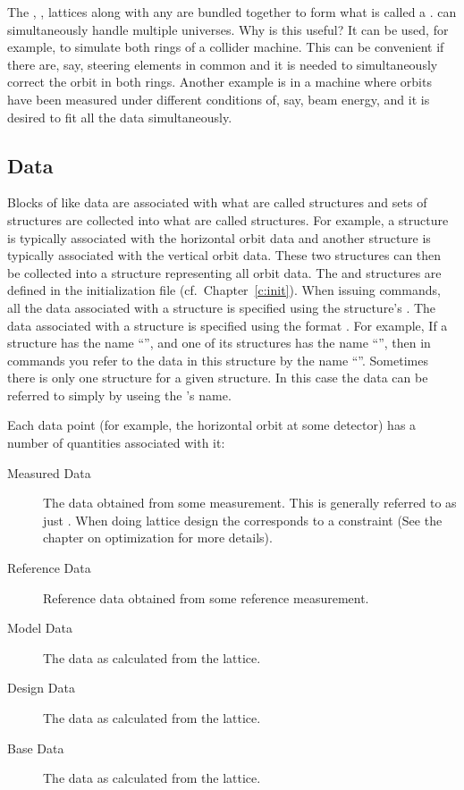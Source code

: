 The , ,  lattices along with any
 are bundled together to form what is called a
. \tao can simultaneously handle multiple universes. Why
is this useful? It can be used, for example, to simulate both rings of
a collider machine. This can be convenient if there are, say, steering
elements in common and it is needed to simultaneously correct the
orbit in both rings. Another example is in a machine where orbits have
been measured under different conditions of, say, beam energy, and it
is desired to fit all the data simultaneously. 

\subsection{Data}

Blocks of like data are associated with what are called 
structures and sets of  structures are collected into what
are called  structures. For example, a 
structure is typically associated with the horizontal orbit data and
another  structure is typically associated with the
vertical orbit data. These two structures can then be collected into a
 structure representing all orbit data. The 
and  structures are defined in the \tao initialization
file (cf.~Chapter~\ref{c:init}).  When issuing \tao commands, all the
data associated with a  structure is specified using the
 structure's .  The data associated with a
 structure is specified using the format
. For example, If a  structure has the
name ``'', and one of its  structures has the name
``'', then in \tao commands you refer to the data in this
 structure by the name ``''. Sometimes there is
only one  structure for a given  structure. In
this case the data can be referred to simply by useing the
's name.

Each data point (for example, the horizontal orbit at some
detector) has a number of quantities associated with it:
  \vspace*{-3ex}
  \begin{description}
  \item[Measured Data] \Newline 
The data obtained from some measurement. This is generally referred to
as just . When doing lattice design the  corresponds to
a constraint (See the chapter on optimization for more details).
  \item[Reference Data] \Newline
Reference data obtained from some reference measurement.
  \item[Model Data] \Newline
The data as calculated from the  lattice.
  \item[Design Data] \Newline
The data as calculated from the  lattice.
  \item[Base Data] \Newline
The data as calculated from the  lattice.
  \end{description}

